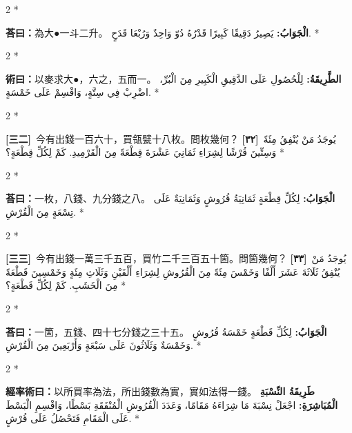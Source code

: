 \documentclass[11pt,a4paper]{article}
\newcommand{\ar}[1]{\arabicfont\beginR #1\endR}
\newcommand{\problemnum}[1]{\textbf{[\ignorespaces#1\unskip]}}
\newenvironment{bilingual}{%
  \begin{paracol}{2}%
  \switchcolumn[0]*%
}{%
  \end{paracol}%
}
\newcommand{\cnline}[1]{\switchcolumn[0]\noindent #1 \switchcolumn[1]}
\newcommand{\arline}[1]{\noindent\ar{#1} \switchcolumn[0]*}
\newenvironment{prob bilingual}{%
  \begin{paracol}{2}%
  \switchcolumn[0]*%
}{%
  \end{paracol}%
  \vspace{0.3em}%
}
\begin{document}
\begin{bilingual}
\cnline{\textcolor{answercolor}{\textbf{荅曰：}}為大●一斗二升。}
\arline{\textcolor{answercolor}{\textbf{الْجَوَابُ:}} يَصِيرُ دَقِيقًا كَبِيرًا قَدْرُهُ دُوّ وَاحِدٌ وَرُبْعَا قَدَحٍ.}
\end{bilingual}

\begin{bilingual}
\cnline{%
\textcolor{methodcolor}{\textbf{術曰：}}以麥求大●，六之，五而一。
}
\arline{%
\textcolor{methodcolor}{\textbf{الطَّرِيقَةُ:}} لِلْحُصُولِ عَلَى الدَّقِيقِ الْكَبِيرِ مِنَ الْبُرِّ، اضْرِبْ فِي سِتَّةٍ، وَاقْسِمْ عَلَى خَمْسَةٍ.
}
\end{bilingual}

\begin{bilingual}
\cnline{\problemnum{三二}\, 今有出錢一百六十，買瓴甓十八枚。問枚幾何？}
\arline{\problemnum{٣٢}\, يُوجَدُ مَنْ يُنْفِقُ مِئَةً وَسِتِّينَ قُرْشًا لِشِرَاءِ ثَمَانِيَ عَشْرَةَ قِطْعَةً مِنَ الْقَرْمِيدِ. كَمْ لِكُلِّ قِطْعَةٍ؟}
\end{bilingual}

\begin{bilingual}
\cnline{\textcolor{answercolor}{\textbf{荅曰：}}一枚，八錢、九分錢之八。}
\arline{\textcolor{answercolor}{\textbf{الْجَوَابُ:}} لِكُلِّ قِطْعَةٍ ثَمَانِيَةُ قُرُوشٍ وَثَمَانِيَةٌ عَلَى تِسْعَةٍ مِنَ الْقُرْشِ.}
\end{bilingual}

\begin{bilingual}
\cnline{\problemnum{三三}\, 今有出錢一萬三千五百，買竹二千三百五十箇。問箇幾何？}
\arline{\problemnum{٣٣}\, يُوجَدُ مَنْ يُنْفِقُ ثَلَاثَةَ عَشَرَ أَلْفًا وَخَمْسَ مِئَةً مِنَ الْقُرُوشِ لِشِرَاءِ أَلْفَيْنِ وَثَلَاثِ مِئَةٍ وَخَمْسِينَ قَطْعَةً مِنَ الْخَشَبِ. كَمْ لِكُلِّ قَطْعَةٍ؟}
\end{bilingual}

\begin{bilingual}
\cnline{\textcolor{answercolor}{\textbf{荅曰：}}一箇，五錢、四十七分錢之三十五。}
\arline{\textcolor{answercolor}{\textbf{الْجَوَابُ:}} لِكُلِّ قَطْعَةٍ خَمْسَةُ قُرُوشٍ وَخَمْسَةٌ وَثَلَاثُونَ عَلَى سَبْعَةٍ وَأَرْبَعِينَ مِنَ الْقُرْشِ.}
\end{bilingual}

\begin{bilingual}
\cnline{%
\textcolor{methodcolor}{\textbf{經率術曰：}}以所買率為法，所出錢數為實，實如法得一錢。
}
\arline{%
\textcolor{methodcolor}{\textbf{طَرِيقَةُ النِّسْبَةِ الْمُبَاشِرَةِ:}} اجْعَلْ نِسْبَةَ مَا شِرَاءَهُ مَقَامًا، وَعَدَدَ الْقُرُوشِ الْمُنْفَقَةِ بَسْطًا، وَاقْسِمِ الْبَسْطَ عَلَى الْمَقَامِ فَتَحْصُلُ عَلَى قُرْشٍ.
}
\end{bilingual}
\end{document}
